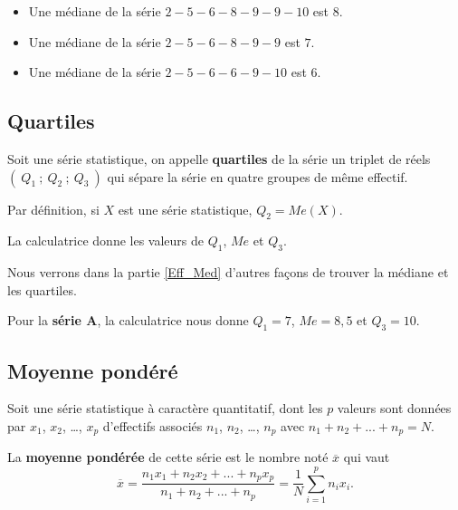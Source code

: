 \begin{ex}{}{}
   \begin{itemize}
      \item Une médiane de la série \og $2-5-6-8-9-9-10$ \fg{} est $8$.
      \item Une médiane de la série \og $2-5-6-8-9-9$ \fg{} est $7$.
      \item Une médiane de la série \og $2-5-6-6-9-10$ \fg{} est $6$.
   \end{itemize}
\end{ex}
\medskip

\subsection{Quartiles}

\begin{defi}{}{}
   Soit une série statistique, on appelle \textbf{quartiles} de la série un triplet de réels $(~Q_1~;~Q_2~;~Q_3~)$ qui sépare la série en quatre groupes de même effectif.
\end{defi}
\medskip

\begin{rem}{}{}
   Par définition, si $X$ est une série statistique, $Q_2 =Me(X)$.
\end{rem}
\medskip

\noindent La calculatrice donne les valeurs de $Q_1$, $Me$ et $Q_3$.

\noindent Nous verrons dans la partie \ref{Eff_Med} d'autres façons de trouver la médiane et les quartiles.

\begin{ex}{}{}
   Pour la \textbf{série A}, la calculatrice nous donne $Q_1=7$, $Me=8,5$ et $Q_3=10$.  
\end{ex}
\medskip

\subsection{Moyenne pondéré}

\begin{defi}{}{}
   Soit une série statistique à caractère quantitatif, dont les $p$ valeurs sont données par $x_1$, $x_2$, \dots, $x_p$ d'effectifs associés $n_1$, $n_2$, \dots, $n_p$ avec $n_1+n_2+...+n_p=N$.
   
   La \textbf{moyenne pondérée} de cette série est le nombre noté $\overline{x}$ qui vaut   $$\overline{x}=\dfrac{n_1x_1+n_2x_2+...+n_px_p}{n_1+n_2+...+n_p}=\dfrac{1}{N}\sum_{i=1}^{p}{n_ix_i}.$$
\end{defi}
\medskip

